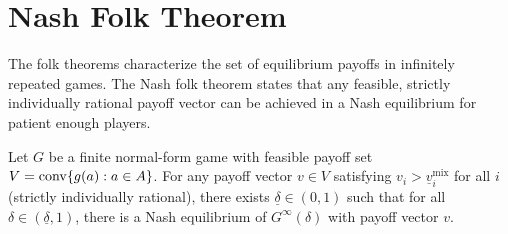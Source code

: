 \documentclass[11pt,a4paper]{article}
\begin{document}

\section{Nash Folk Theorem}
\label{sec:nash-folk}

The folk theorems characterize the set of equilibrium payoffs in infinitely
repeated games. The Nash folk theorem states that any feasible, strictly
individually rational payoff vector can be achieved in a Nash equilibrium
for patient enough players.

\begin{keyresult}[title={Nash Folk Theorem}]
\begin{theorem}
\label{thm:nash-folk}
Let $G$ be a finite normal-form game with feasible payoff set
$V = \operatorname{conv}\{g(a) : a \in A\}$. For any payoff vector $v \in V$ satisfying
$v_i > \underline{v}_i^{\mathrm{mix}}$ for all $i$ (strictly individually
rational), there exists $\underline{\delta} \in (0,1)$ such that for all
$\delta \in (\underline{\delta}, 1)$, there is a Nash equilibrium of
$G^\infty(\delta)$ with payoff vector $v$.
\end{theorem}
\end{keyresult}
\end{document}
